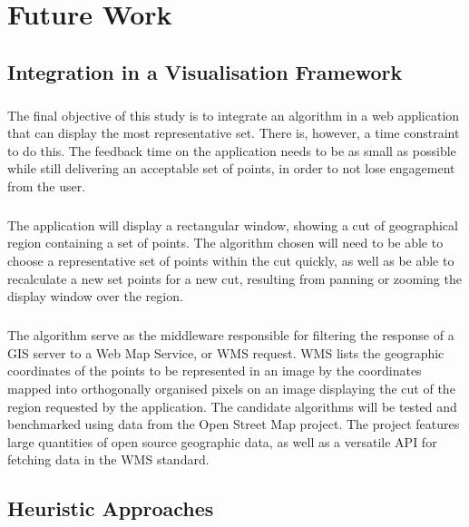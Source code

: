 \chapter{Future Work}
\label{chap:future}
\section{Integration in a Visualisation Framework}
\paragraph{}
The final objective of this study is to integrate an algorithm in a web application that can display the most representative set. There is, however, a time constraint to do this. The feedback time on the application needs to be as small as possible while still delivering an acceptable set of points, in order to not lose engagement from the user.
\paragraph{}
The application will display a rectangular window, showing a cut of geographical region containing a set of points. The algorithm chosen will need to be able to choose a representative set of points within the cut quickly, as well as be able to recalculate a new set points for a new cut, resulting from panning or zooming the display window over the region.
\paragraph{}
The algorithm serve as the middleware responsible for filtering the response of a GIS server to a Web Map Service, or WMS request. WMS lists the geographic coordinates of the points to be represented in an image by the coordinates mapped into orthogonally organised pixels on an image displaying the cut of the region requested by the application.
The candidate algorithms will be tested and benchmarked using data from the Open Street Map project. The project features large quantities of open source geographic data, as well as a versatile API for fetching data in the WMS standard.
\section{Heuristic Approaches}
